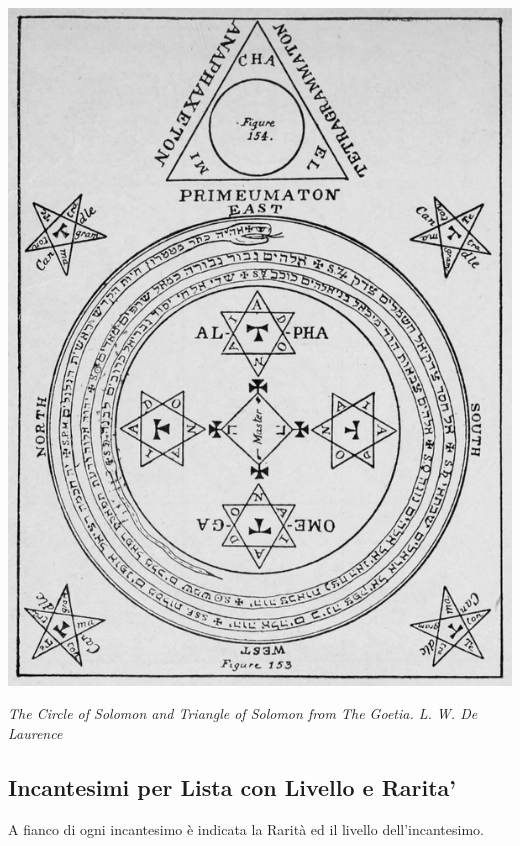 \vfill

\begin{center}
\includegraphics[keepaspectratio,width=0.5\linewidth]{immagini/Goetic_circle_from_The_Lesser_Key_of_Solomon.png}

\medskip

\emph{The Circle of Solomon and Triangle of Solomon from The Goetia. L. W. De Laurence}
\end{center}

\pagebreak

\subsection{Incantesimi per Lista con Livello e Rarita'}\hypertarget{elencoscuole}{}

A fianco di ogni incantesimo è indicata la Rarità ed il livello dell'incantesimo.

